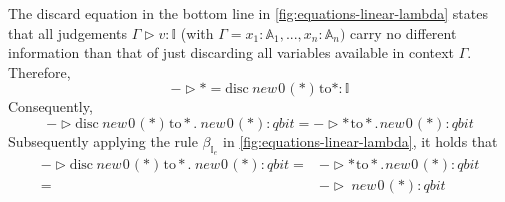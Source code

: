 The discard equation in  the bottom line  in \autoref{fig:equations-linear-lambda} states that all judgements $\Gamma \triangleright v : \mathbb{I}$ (with $\Gamma = x_{1} : \mathbb{A}_1, . . . , x_{n} : \mathbb{A}_n)$ carry no different information than that of just discarding all variables available in context $\Gamma$. Therefore, 
\begin{equation}
  -  \triangleright * =  \text{disc} \hspace{3pt} \textit{new}\hspace{1pt}0 \hspace{1pt}(*) \hspace{1pt} \text{to} * : \mathbb{I}
\end{equation}
Consequently,
\begin{equation}
 - \triangleright \text{disc} \hspace{3pt} \textit{new}\hspace{1pt}0 \hspace{1pt}(*) \hspace{1pt} \text{to} *. \hspace{3pt} \textit{new}\hspace{1pt}0 \hspace{1pt}(*): \textit{qbit} = - \triangleright * \hspace{1pt} \text{to} *. \hspace{1pt} \textit{new}\hspace{1pt}0 \hspace{1pt}(*): \textit{qbit}
\end{equation}
Subsequently applying the rule  $\beta_{\mathbb{I}_{e}}$ in \autoref{fig:equations-linear-lambda}, it holds that
\begin{equation}
  \begin{split}
    - \triangleright \text{disc} \hspace{3pt} \textit{new}\hspace{1pt}0 \hspace{1pt}(*) \hspace{1pt} \text{to} *. \hspace{3pt} \textit{new}\hspace{1pt}0 \hspace{1pt}(*): \textit{qbit}  =& - \triangleright * \hspace{1pt} \text{to} *. \hspace{1pt}\textit{new}\hspace{1pt}0 \hspace{1pt}(*): \textit{qbit}\\
  = &  - \triangleright \hspace{3pt} \textit{new}\hspace{1pt}0 \hspace{1pt}(*): \textit{qbit}
\end{split}
\end{equation}

